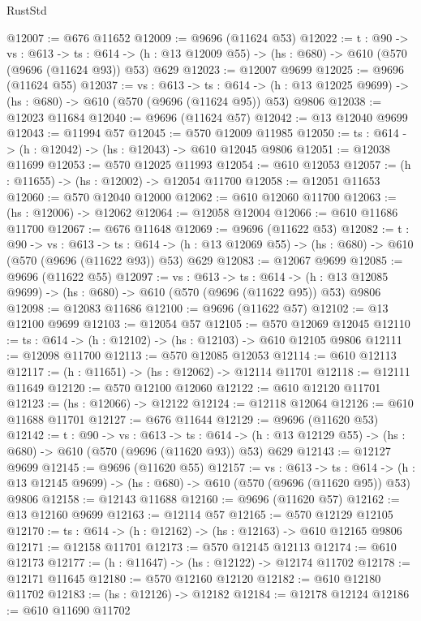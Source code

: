 \begin{lexlean}{RustStd}
\begin{coremodule}
@12007 := @676 @11652
@12009 := @9696 (@11624 @53)
@12022 := {t : @90} ->
  {vs : @613} ->
  {ts : @614} -> (h : @13 @12009 @55) -> (hs : @680) -> @610 (@570 (@9696 (@11624 @93)) @53) @629
@12023 := @12007 @9699
@12025 := @9696 (@11624 @55)
@12037 := {vs : @613} ->
  {ts : @614} -> (h : @13 @12025 @9699) -> (hs : @680) -> @610 (@570 (@9696 (@11624 @95)) @53) @9806
@12038 := @12023 @11684
@12040 := @9696 (@11624 @57)
@12042 := @13 @12040 @9699
@12043 := @11994 @57
@12045 := @570 @12009 @11985
@12050 := {ts : @614} -> (h : @12042) -> (hs : @12043) -> @610 @12045 @9806
@12051 := @12038 @11699
@12053 := @570 @12025 @11993
@12054 := @610 @12053
@12057 := (h : @11655) -> (hs : @12002) -> @12054 @11700
@12058 := @12051 @11653
@12060 := @570 @12040 @12000
@12062 := @610 @12060 @11700
@12063 := (hs : @12006) -> @12062
@12064 := @12058 @12004
@12066 := @610 @11686 @11700
@12067 := @676 @11648
@12069 := @9696 (@11622 @53)
@12082 := {t : @90} ->
  {vs : @613} ->
  {ts : @614} -> (h : @13 @12069 @55) -> (hs : @680) -> @610 (@570 (@9696 (@11622 @93)) @53) @629
@12083 := @12067 @9699
@12085 := @9696 (@11622 @55)
@12097 := {vs : @613} ->
  {ts : @614} -> (h : @13 @12085 @9699) -> (hs : @680) -> @610 (@570 (@9696 (@11622 @95)) @53) @9806
@12098 := @12083 @11686
@12100 := @9696 (@11622 @57)
@12102 := @13 @12100 @9699
@12103 := @12054 @57
@12105 := @570 @12069 @12045
@12110 := {ts : @614} -> (h : @12102) -> (hs : @12103) -> @610 @12105 @9806
@12111 := @12098 @11700
@12113 := @570 @12085 @12053
@12114 := @610 @12113
@12117 := (h : @11651) -> (hs : @12062) -> @12114 @11701
@12118 := @12111 @11649
@12120 := @570 @12100 @12060
@12122 := @610 @12120 @11701
@12123 := (hs : @12066) -> @12122
@12124 := @12118 @12064
@12126 := @610 @11688 @11701
@12127 := @676 @11644
@12129 := @9696 (@11620 @53)
@12142 := {t : @90} ->
  {vs : @613} ->
  {ts : @614} -> (h : @13 @12129 @55) -> (hs : @680) -> @610 (@570 (@9696 (@11620 @93)) @53) @629
@12143 := @12127 @9699
@12145 := @9696 (@11620 @55)
@12157 := {vs : @613} ->
  {ts : @614} -> (h : @13 @12145 @9699) -> (hs : @680) -> @610 (@570 (@9696 (@11620 @95)) @53) @9806
@12158 := @12143 @11688
@12160 := @9696 (@11620 @57)
@12162 := @13 @12160 @9699
@12163 := @12114 @57
@12165 := @570 @12129 @12105
@12170 := {ts : @614} -> (h : @12162) -> (hs : @12163) -> @610 @12165 @9806
@12171 := @12158 @11701
@12173 := @570 @12145 @12113
@12174 := @610 @12173
@12177 := (h : @11647) -> (hs : @12122) -> @12174 @11702
@12178 := @12171 @11645
@12180 := @570 @12160 @12120
@12182 := @610 @12180 @11702
@12183 := (hs : @12126) -> @12182
@12184 := @12178 @12124
@12186 := @610 @11690 @11702

\end{coremodule}
\end{lexlean}
